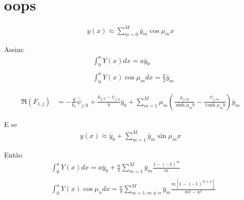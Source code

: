 \section{oops}

\begin{align}
y(x) \approx \sum_{m=0}^M \bar{y}_m \cos\mu_m x
\end{align}

Assim:
\begin{align}
& \int_0^a Y(x)dx = a \bar{y}_0 \\ \nonumber \\
& \int_0^a Y(x)\cos\mu_m dx = \frac{a}{2}\bar{y}_m
\end{align}

\begin{align}
\Re(F_{1,j})
& =
-\frac{q}{k_1}\bar{\psi}_{j,0} + \frac{\mathbb{A}_{j,0} - \bar{\psi}_{j,0}}{b} \bar{y}_0 + \sum_{m=1}^M \mu_m \left(\frac{\mathbb{A}_{j,m}}{\sinh\mu_m b} - \frac{\bar{\psi}_{j, m}}{\tanh\mu_m b}\right)\bar{y}_m
\end{align}

E se
\begin{align}
y(x) \approx \bar{y}_0 + \sum_{m=1}^M \bar{y}_m \sin\mu_m x
\end{align}

Então
\begin{align}
& \int_0^a Y(x)dx = a \bar{y}_0 + \frac{a}{\pi}\sum_{m=1}^M \bar{y}_m \frac{1 - (-1)^m}{m} \\ \nonumber \\
& \int_0^a Y(x)\cos\mu_n dx =\frac{a}{\pi}\sum_{m=1,m\ne n}^M \bar{y}_m \frac{m[1 - (-1)^{m+n}]}{m^2 - n^2}
\end{align}

\begin{figure}[h!b]
\end{figure}

\begin{figure}[h!b]
\end{figure}

\begin{figure}[h!b]
\end{figure}

\begin{figure}[h!b]
\end{figure}

